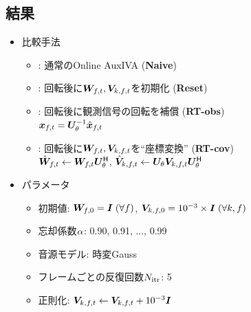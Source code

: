 \documentclass[sip,biber]{now-journal}
\begin{document}
\subsection{結果}
\begin{itemize}
  \item 比較手法
    \begin{itemize}
      \item {}: 通常のOnline AuxIVA (\textbf{Naive})
      \item {}: 回転後に$\Demix _{\ft}, \cov _{\src,\ft}$を初期化 (\textbf{Reset})
      \item {}: 回転後に観測信号の回転を補償 (\textbf{RT-obs})\\
        $\Obs _{\ft} = \rotMat _{\rotDeg} ^{-1} \rot{\Obs} _{\ft}$
      \item {}: 回転後に$\Demix _{\ft}, \cov _{\src,\ft}$を``座標変換'' (\textbf{RT-cov})\\
        $\rot{\Demix} _{\ft} \gets \Demix _{\ft} \rotMat _{\rotDeg} ^{\hermite}$,\; $\rot{\cov} _{\src,\ft} \gets \rotMat _{\rotDeg} \cov _{\src,\ft} \rotMat _{\rotDeg} ^{\hermite}$
    \end{itemize}
  \item パラメータ
    \begin{itemize}
      \item 初期値: $\bm{W} _{f,0} = \bm{I}\; (\forall f)$, $\bm{V} _{k,f,0} = 10^{-3}\times\bm{I}\; (\forall k, f)$
      \item 忘却係数$\alpha$: 0.90, 0.91, ..., 0.99
      \item 音源モデル: 時変Gauss
      \item フレームごとの反復回数$N _{\mathrm{itr}}$: 5
      \item 正則化: $\cov _{\src,\ft} \gets \cov _{\src,\ft} + 10 ^{-3} \Eye$
    \end{itemize}
\end{itemize}
\end{document}
